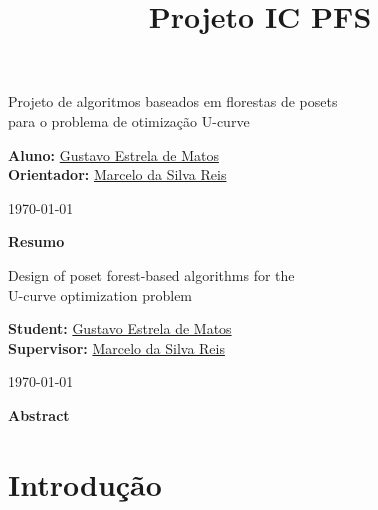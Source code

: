\documentclass[12pt]{article}
\title{Projeto IC PFS}
\begin{document}
%
\doublespacing

\begin{center}
    {\LARGE Projeto de algoritmos baseados em florestas de posets\\
        \bigskip 
        para o problema de otimização U-curve}

    \bigskip        

    {\large {\bf Aluno:} \href{mailto:gustavo.estrela.matos@usp.br}
        {Gustavo Estrela de Matos}\\ 
    {\bf Orientador:} \href{mailto:marcelo.reis@butantan.gov.br}
        {Marcelo da Silva Reis}\\

    \bigskip

    \today\\
    }

    \bigskip
    \bigskip

    {\bf Resumo}    
\end{center}

\newpage

\begin{center}
    {\LARGE Design of poset forest-based algorithms for the\\
        \bigskip 
        U-curve optimization problem}

    \bigskip        

    {\large {\bf Student:} \href{mailto:gustavo.estrela.matos@usp.br}
        {Gustavo Estrela de Matos}\\ 
    {\bf Supervisor:} \href{mailto:marcelo.reis@butantan.gov.br}
        {Marcelo da Silva Reis}\\

    \bigskip

    \today\\
    }

    \bigskip
    \bigskip

    {\bf Abstract}    
\end{center}
    
\newpage
\tableofcontents
\newpage

\section{Introdução}
% 
\end{document}
